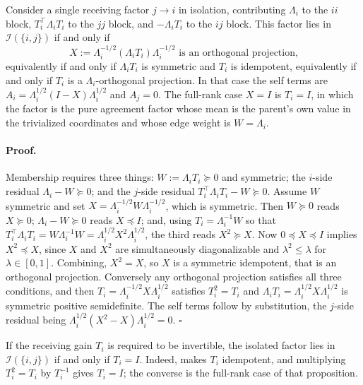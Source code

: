 Consider a single receiving factor $j\to i$ in isolation, contributing $\Lambda_i$ to the $ii$ block, $T_i^\top\Lambda_iT_i$ to the $jj$ block, and $-\Lambda_iT_i$ to the $ij$ block. This factor lies in $\mathcal I(\{i,j\})$ if and only if
\begin{equation}
X:=\Lambda_i^{-1/2}\left(\Lambda_iT_i\right)\Lambda_i^{-1/2}
\text{ is an orthogonal projection,}
\label{eq:gauss-edge-local}
\end{equation}
equivalently if and only if $\Lambda_iT_i$ is symmetric and $T_i$ is idempotent, equivalently if and only if $T_i$ is a $\Lambda_i$-orthogonal projection. In that case the self terms are $A_i=\Lambda_i^{1/2}(I-X)\Lambda_i^{1/2}$ and $A_j=0$. The full-rank case $X=I$ is $T_i=I$, in which the factor is the pure agreement factor whose mean is the parent's own value in the trivialized coordinates and whose edge weight is $W=\Lambda_i$. 

\paragraph{Proof.}
Membership requires three things: $W:=\Lambda_iT_i\succeq0$ and symmetric; the $i$-side residual $\Lambda_i-W\succeq0$; and the $j$-side residual $T_i^\top\Lambda_iT_i-W\succeq0$. Assume $W$ symmetric and set $X=\Lambda_i^{-1/2}W\Lambda_i^{-1/2}$, which is symmetric. Then $W\succeq0$ reads $X\succeq0$; $\Lambda_i-W\succeq0$ reads $X\preceq I$; and, using $T_i=\Lambda_i^{-1}W$ so that $T_i^\top\Lambda_iT_i=W\Lambda_i^{-1}W=\Lambda_i^{1/2}X^2\Lambda_i^{1/2}$, the third reads $X^2\succeq X$. Now $0\preceq X\preceq I$ implies $X^2\preceq X$, since $X$ and $X^2$ are simultaneously diagonalizable and $\lambda^2\leq\lambda$ for $\lambda\in[0,1]$. Combining, $X^2=X$, so $X$ is a symmetric idempotent, that is an orthogonal projection. Conversely any orthogonal projection satisfies all three conditions, and then $T_i=\Lambda_i^{-1/2}X\Lambda_i^{1/2}$ satisfies $T_i^2=T_i$ and $\Lambda_iT_i=\Lambda_i^{1/2}X\Lambda_i^{1/2}$ is symmetric positive semidefinite. The self terms follow by substitution, the $j$-side residual being $\Lambda_i^{1/2}(X^2-X)\Lambda_i^{1/2}=0$. $\square$

If the receiving gain \(T_i\) is required to be invertible, the isolated factor lies in \(\mathcal I(\{i,j\})\) if and only if \(T_i=I\). Indeed,  makes \(T_i\) idempotent, and multiplying \(T_i^2=T_i\) by \(T_i^{-1}\) gives \(T_i=I\); the converse is the full-rank case of that proposition. 

